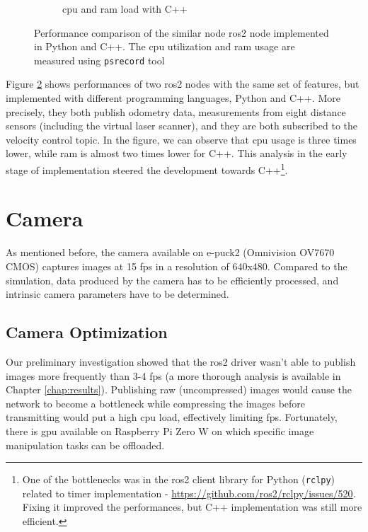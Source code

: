 \begin{figure}[H]
\begin{subfigure}{.8\textwidth}
  \caption{\ac{cpu} and \ac{ram} load with C++}
  \label{fig:physical:py_vs_cpp:cpp}
\end{subfigure}
\caption[Performance comparison of implementations in Python and C++]{Performance comparison of the similar node \ac{ros2} node implemented in Python and C++. The \ac{cpu} utilization and \ac{ram} usage are measured using \texttt{psrecord} tool\footnotemark}
\label{fig:physical:py_vs_cpp}
\end{figure}

Figure \ref{fig:physical:py_vs_cpp} shows performances of two \ac{ros2} nodes with the same set of features, but implemented with different programming languages, Python and C++.
More precisely, they both publish odometry data, measurements from eight distance sensors (including the virtual laser scanner), and they are both subscribed to the velocity control topic.
In the figure, we can observe that \ac{cpu} usage is three times lower, while \ac{ram} is almost two times lower for C++.
This analysis in the early stage of implementation steered the development towards C++\footnote{One of the bottlenecks was in the \ac{ros2} client library for Python (\texttt{rclpy}) related to timer implementation - \url{https://github.com/ros2/rclpy/issues/520}. Fixing it improved the performances, but C++ implementation was still more efficient.}.

\section{Camera}
As mentioned before, the camera available on e-puck2 (Omnivision OV7670 CMOS) captures images at 15 \acs{fps} in a resolution of 640x480.
Compared to the simulation, data produced by the camera has to be efficiently processed, and intrinsic camera parameters have to be determined.

\subsection{Camera Optimization}
Our preliminary investigation showed that the \ac{ros2} driver wasn't able to publish images more frequently than 3-4 \acs{fps} (a more thorough analysis is available in Chapter \ref{chap:results}).
Publishing raw (uncompressed) images would cause the network to become a bottleneck while compressing the images before transmitting would put a high \ac{cpu} load, effectively limiting \ac{fps}.
Fortunately, there is \ac{gpu} available on Raspberry Pi Zero W on which specific image manipulation tasks can be offloaded.

